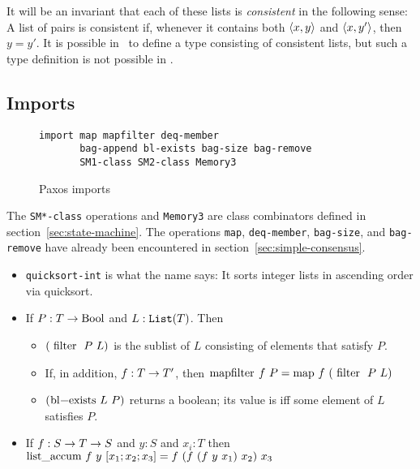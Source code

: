 \documentclass[final]{article}
\newcommand{\listinline}[1]{\text{\lstinline{#1}}}
\begin{document}
It will be an invariant that each of these lists is \emph{consistent}
in the following sense: 
%
%
A list of pairs is consistent if, whenever it contains both
$\langle x,y\rangle$ and $\langle x,y'\rangle$, then $y = y'$.  It is
possible in \nuprl\ to define a type consisting of consistent lists,
but such a type definition is not possible in \eml.

\subsection{Imports}

\begin{figure}%
  \begin{lstlisting}[basicstyle=\small]
import map mapfilter deq-member 
       bag-append bl-exists bag-size bag-remove 
       SM1-class SM2-class Memory3
  \end{lstlisting}
  \caption{Paxos imports}
  \label{fig:Paxos-imports}
\end{figure}

The \lstinline{SM*-class} operations and \lstinline{Memory3} are class
combinators defined in section~\ref{sec:state-machine}.  The
operations \lstinline{map}, \lstinline{deq-member},
\lstinline{bag-size}, and \lstinline{bag-remove} have already been
encountered in section~\ref{sec:simple-consensus}.

\begin{itemize}
\item
\lstinline{quicksort-int} is what the name says: It sorts integer
lists in ascending order via quicksort.

\item
If $P:\NUPRLarrow{T}{\listinline{Bool}}$ and
$L:\mathtt{List}(T)$.  Then 

   \begin{itemize}
   \item
   $(\listinline{filter}~P~L)$ is the sublist of $L$ consisting
   of elements that satisfy $P$.  

    \item
    If, in addition, $f:T\rightarrow T'$, then
    $\listinline{mapfilter}~f~P = 
    \listinline{map}~f~(\listinline{filter}~P~L)$


    \item
    $(\listinline{bl-exists}~L~P)$ returns a boolean; its value is
      \listinline{true} iff some element of $L$ satisfies
      $P$. 

    \end{itemize}

\item
If $f:S\rightarrow T\rightarrow S$ and
$y:S$ and $x_i:T$ then
   $\listinline{list_accum}~f~y~[x_1;x_2;x_3] =
   f~(f~(f~y~x_1)~x_2)~x_3$
\end{itemize}
\end{document}
